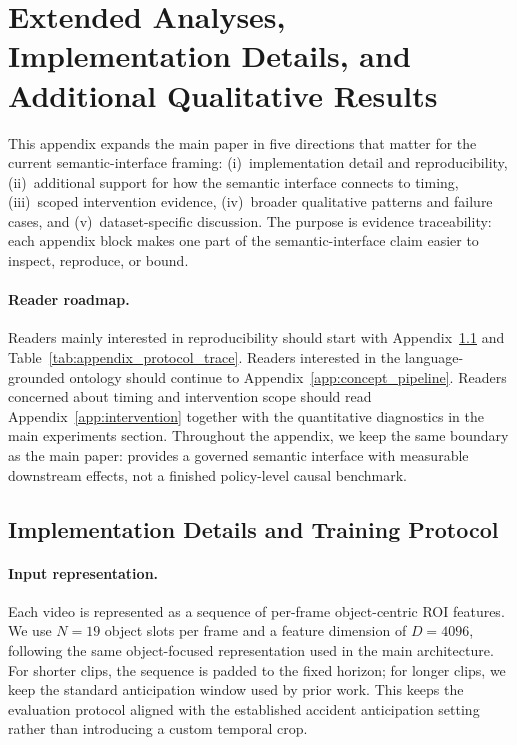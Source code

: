 \section{Extended Analyses, Implementation Details, and Additional Qualitative Results}
\label{sec:appendix}

This appendix expands the main paper in five directions that matter for the
current semantic-interface framing: (i)~implementation detail and reproducibility,
(ii)~additional support for how the semantic interface connects to timing,
(iii)~scoped intervention evidence, (iv)~broader qualitative patterns and
failure cases, and (v)~dataset-specific discussion. The purpose is evidence
traceability: each appendix block makes one part of the semantic-interface
claim easier to inspect, reproduce, or bound.

\paragraph{Reader roadmap.}
Readers mainly interested in reproducibility should start with
Appendix~\ref{app:impl} and Table~\ref{tab:appendix_protocol_trace}. Readers
interested in the language-grounded ontology should continue to
Appendix~\ref{app:concept_pipeline}. Readers concerned about timing and
intervention scope should read Appendix~\ref{app:intervention} together with
the quantitative diagnostics in the main experiments section. Throughout the
appendix, we keep the same boundary as the main paper: \method{} provides a
governed semantic interface with measurable downstream effects, not a finished
policy-level causal benchmark.

\subsection{Implementation Details and Training Protocol}
\label{app:impl}

\paragraph{Input representation.}
Each video is represented as a sequence of per-frame object-centric ROI
features. We use $N{=}19$ object slots per frame and a feature dimension of
$D{=}4096$, following the same object-focused representation used in the main
architecture. For shorter clips, the sequence is padded to the fixed horizon;
for longer clips, we keep the standard anticipation window used by prior work.
This keeps the evaluation protocol aligned with the established accident
anticipation setting rather than introducing a custom temporal crop.

